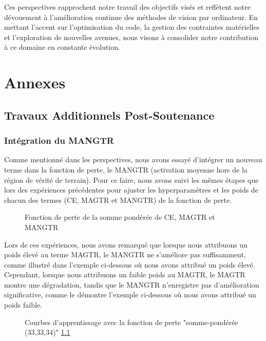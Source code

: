 \documentclass{report}
\begin{document}
{Ces perspectives rapprochent notre travail des objectifs visés et reflètent notre dévouement à l'amélioration continue des méthodes de vision par ordinateur. En mettant l'accent sur l'optimisation du code, la gestion des contraintes matérielles et l'exploration de nouvelles avenues, nous visons à consolider notre contribution à ce domaine en constante évolution.

\printbibliography
\chapter{Annexes}
\section{Travaux Additionnels Post-Soutenance}
\subsection{Intégration du MANGTR}

\hspace{1.6cm}Comme mentionné dans les perspectives, nous avons essayé d'intégrer un nouveau terme dans la fonction de perte, le MANGTR (activation moyenne hors de la région de vérité de terrain). Pour ce faire, nous avons suivi les mêmes étapes que lors des expériences précédentes pour ajuster les hyperparamètres et les poids de chacun des termes (CE, MAGTR et MANGTR) de la fonction de perte.

    
    \begin{figure}[htbp] 
	\centering
	\caption{Fonction de perte de la somme pondérée de CE, MAGTR et MANGTR}
	\label{fig:Fonction de perte de la somme pndérée de CE, MAGTR et MANGTR}
    \end{figure}
    
\hspace{1.6cm}Lors de ces expériences, nous avons remarqué que lorsque nous attribuons un poids élevé au terme MAGTR, le MANGTR ne s'améliore pas suffisamment, comme illustré dans l'exemple ci-dessous où nous avons attribué un poids élevé. Cependant, lorsque nous attribuons un faible poids au MAGTR, le MAGTR montre une dégradation, tandis que le MANGTR n'enregistre pas d'amélioration significative, comme le démontre l'exemple ci-dessous où nous avons attribué un poids faible.

    \begin{figure}[htbp] 
	\centering
	\caption{Courbes d'apprentissage avec la fonction de perte "somme-pondérée (33,33,34)" \ref{fig:Fonction de perte de la somme pndérée de CE, MAGTR et MANGTR}}
	\label{fig:Courbes d'apprentissage de l'expérience "somme-pondérée mangtr333"}
    \end{figure}

}
\end{document}
